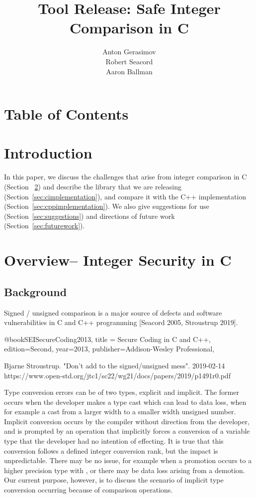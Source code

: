 \documentclass[11pt,letterpaper]{article}
\title{Tool Release: Safe Integer Comparison in C}
\author{Anton Gerasimov\\
Robert Seacord\\
Aaron Ballman}
\begin{document}
\maketitle
\newpage
\thispagestyle{fancy}
\clearpage
\section*{Table of Contents}
\makeatletter
\renewcommand\tableofcontents{\@starttoc{toc}} %
\makeatother
\bgroup%
\hypersetup%
\tableofcontents
\egroup%
\thispagestyle{nccsection}
\pagebreak


\section{Introduction}

In this paper, we discuss the challenges that arise from integer comparison in C (Section~
\ref{sec:overview}) and describe the library that we are releasing (Section~\ref{sec:cimplementation}), and compare it with the C++ implementation (Section~\ref{sec:cppimplementation}). 
We also give suggestions for use (Section~\ref{sec:suggestions}) and directions of future work (Section~\ref{sec:futurework}).

\section{Overview– Integer Security in C}
\label{sec:overview}

\subsection{Background }

Signed / unsigned comparison is a major source of defects and software vulnerabilities in C and C++ programming [Seacord 2005, Stroustrup 2019].

@book{SEISecureCoding2013,
title = {Secure Coding in C and C++},
edition={Second},
year={2013},
publisher={Addison-Wesley Professional},
}

Bjarne Stroustrup.  "Don’t add to the signed/unsigned mess". 2019-02-14 https://www.open-std.org/jtc1/sc22/wg21/docs/papers/2019/p1491r0.pdf


Type conversion errors can be of two types, explicit and implicit. The former occurs when the developer makes a type cast which can lead to data loss, when for example a cast from a larger width to a smaller width unsigned number. Implicit conversion occurs by the compiler without direction from the developer, and is prompted by an operation that implicitly forces a conversion of a variable type that the developer had no intention of effecting. It is true that this conversion follows a defined integer conversion rank, but the impact is unpredictable. There may be no issue, for example when a promotion occurs to a higher precision type with , or there may be data loss arising from a demotion. Our current purpose, however, is to discuss the scenario of implicit type conversion occurring because of comparison operations.
\end{document}
